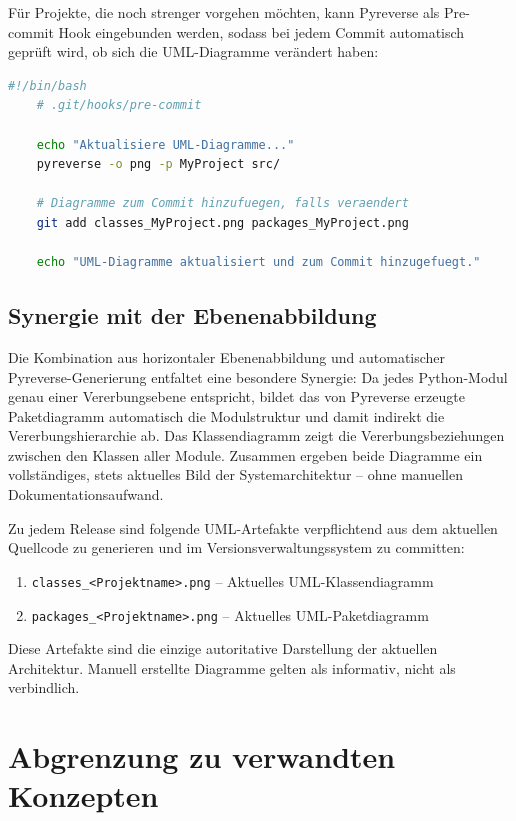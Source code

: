 ﻿\documentclass[a4paper,12pt]{article}
\begin{document}
Für Projekte, die noch strenger vorgehen möchten, kann Pyreverse als
Pre-commit Hook eingebunden werden, sodass bei jedem Commit automatisch
geprüft wird, ob sich die UML-Diagramme verändert haben:

\begin{lstlisting}[language=bash, caption={Pre-commit Hook fuer Pyreverse},
	label={lst:precommit}]
	#!/bin/bash
	# .git/hooks/pre-commit
	
	echo "Aktualisiere UML-Diagramme..."
	pyreverse -o png -p MyProject src/
	
	# Diagramme zum Commit hinzufuegen, falls veraendert
	git add classes_MyProject.png packages_MyProject.png
	
	echo "UML-Diagramme aktualisiert und zum Commit hinzugefuegt."
\end{lstlisting}

\subsection{Synergie mit der Ebenenabbildung}

Die Kombination aus horizontaler Ebenenabbildung und automatischer
Pyreverse-Generie\-rung entfaltet eine besondere Synergie: Da jedes Python-Modul
genau einer Vererbungsebene entspricht, bildet das von Pyreverse erzeugte
Paketdiagramm automatisch die Modulstruktur und damit indirekt die
Vererbungshierarchie ab. Das Klassendiagramm zeigt die Vererbungsbeziehungen
zwischen den Klassen aller Module. Zusammen ergeben beide Diagramme ein
vollständiges, stets aktuelles Bild der Systemarchitektur -- ohne manuellen
Dokumentationsaufwand.

Zu jedem Release sind folgende UML-Artefakte verpflichtend aus dem aktuellen
Quellcode zu generieren und im Versionsverwaltungssystem zu committen:
\begin{enumerate}
	\item \texttt{classes\_<Projektname>.png} -- Aktuelles UML-Klassendiagramm
	\item \texttt{packages\_<Projektname>.png} -- Aktuelles UML-Paketdiagramm
\end{enumerate}
Diese Artefakte sind die einzige autoritative Darstellung der aktuellen
Architektur. Manuell erstellte Diagramme gelten als informativ, nicht als
verbindlich.

\section{Abgrenzung zu verwandten Konzepten}
\end{document}
